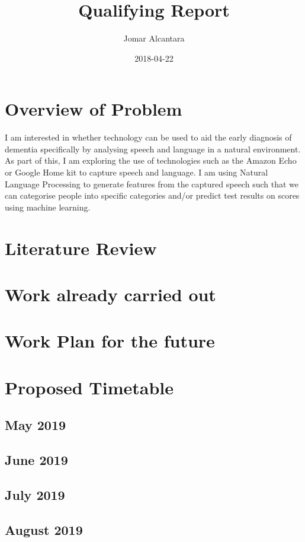 \documentclass{article}
\title{Qualifying Report}
\date{2018-04-22}
\author{Jomar Alcantara}
\begin{document}
	\maketitle
	\newpage
	\section{Overview of Problem}
	I am interested in whether technology can be used to aid the early diagnosis of dementia specifically by analysing speech and language in a natural environment. As part of this, I am exploring the use of technologies such as the Amazon Echo or Google Home kit to capture speech and language. I am using Natural Language Processing to generate features from the captured speech such that we can categorise people into specific categories and/or predict test results on scores using machine learning.
	
	\section{Literature Review}
	
	\section{Work already carried out}
	
	\section{Work Plan for the future}
	
	\section{Proposed Timetable}
	\subsection{May 2019}
	
	\subsection{June 2019}
	
	\subsection{July 2019}
	
	\subsection{August 2019}
	
\end{document}
